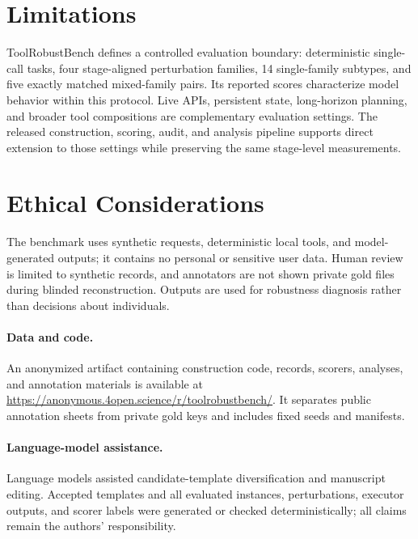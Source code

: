 \documentclass[11pt]{article}
\newcommand{\ToolRobustBench}{ToolRobustBench\xspace}
\begin{document}
\section{Limitations}

\ToolRobustBench{} defines a controlled evaluation boundary: deterministic single-call tasks, four stage-aligned perturbation families, 14 single-family subtypes, and five exactly matched mixed-family pairs. Its reported scores characterize model behavior within this protocol. Live APIs, persistent state, long-horizon planning, and broader tool compositions are complementary evaluation settings. The released construction, scoring, audit, and analysis pipeline supports direct extension to those settings while preserving the same stage-level measurements.

\section{Ethical Considerations}

The benchmark uses synthetic requests, deterministic local tools, and model-generated outputs; it contains no personal or sensitive user data. Human review is limited to synthetic records, and annotators are not shown private gold files during blinded reconstruction. Outputs are used for robustness diagnosis rather than decisions about individuals.

\paragraph{Data and code.} An anonymized artifact containing construction code, records, scorers, analyses, and annotation materials is available at \url{https://anonymous.4open.science/r/toolrobustbench/}. It separates public annotation sheets from private gold keys and includes fixed seeds and manifests.

\paragraph{Language-model assistance.} Language models assisted candidate-template diversification and manuscript editing. Accepted templates and all evaluated instances, perturbations, executor outputs, and scorer labels were generated or checked deterministically; all claims remain the authors' responsibility.



\clearpage
\appendix
\setcounter{figure}{4}
\end{document}
